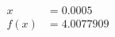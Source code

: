 \documentclass[preview]{standalone}
\begin{document}
\begin{align*}
x &= 0.0005\\f(x) &= 4.0077909
\end{align*}
\end{document}
